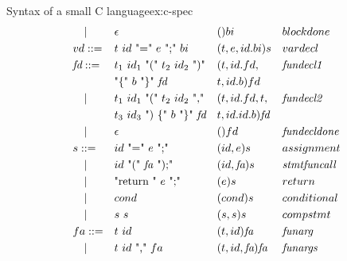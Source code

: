 \begin{example}[breakable]{Syntax of a small C language}{ex:c-spec}
\[\begin{aligned}
       & \quad |         &  & \epsilon                                               &  & ()bi                          &  & blockdone            \\
       & vd ::=          &  & \text{$t$ $id$ "=" $e$ ";" $bi$}                       &  & (t,e,id.bi)s                  &  & vardecl              \\
       & \textit{fd} ::= &  & \text{$t_1$ $id_1$ "(" $t_2$ $id_2$ ")"}               &  & (t,id.fd,                     &  & \textit{fundecl1}    \\
       &                 &  & \text{"\{" $b$ "\}" \textit{fd}}                       &  & t,id.b)fd                                               \\
       & \quad |         &  & \text{$t_1$ $id_1$ "(" $t_2$ $id_2$ ","}               &  & (t,id.fd,t,                   &  & \textit{fundecl2}    \\
       &                 &  & \text{$t_3$ $id_3$ ") \{" $b$ "\}" $\textit{fd}$}      &  & t,id.id.b)\textit{fd}                                   \\
       & \quad |         &  & \text{$\epsilon$}                                      &  & ()fd                          &  & \textit{fundecldone} \\
       & s ::=           &  & \text{$id$ "=" $e$ ";"}                                &  & (id,e)s                       &  & assignment           \\
       & \quad |         &  & \text{$id$ "(" \textit{fa} ");"}                       &  & (id,\textit{fa})s             &  & \textit{stmtfuncall} \\
       & \quad |         &  & \text{"return " $e$ ";"}                               &  & (e)s                          &  & return               \\
       & \quad |         &  & \text{$cond$}                                          &  & (cond)s                       &  & conditional          \\
       & \quad |         &  & \text{$s$ $s$}                                         &  & (s,s)s                        &  & compstmt             \\
       & fa ::=          &  & \text{$t$ $id$}                                        &  & (t,id)\textit{fa}             &  & \textit{funarg}      \\
       & \quad |         &  & \text{$t$ $id$ "," $fa$}                               &  & (t,id,\textit{fa})\textit{fa} &  & \textit{funargs}     \\

\end{aligned}\]
\end{example}
